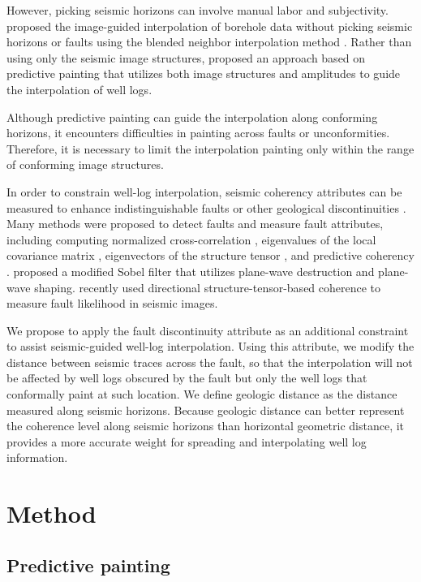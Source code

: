 However, picking seismic horizons can involve manual labor and subjectivity.
\cite{hale2010} proposed the image-guided interpolation of borehole data without picking seismic horizons or faults using the blended neighbor interpolation method \cite[]{hale2009}.
Rather than using only the seismic image structures, \cite{karimi} proposed an approach based on predictive painting \cite[]{pred} that utilizes both image structures and amplitudes to guide the interpolation of well logs.

Although predictive painting can guide the interpolation along conforming horizons, it encounters difficulties in painting across faults or unconformities.
Therefore, it is necessary to limit the interpolation painting only within the range of conforming image structures.

In order to constrain well-log interpolation, seismic coherency attributes can be measured to enhance indistinguishable faults or other geological discontinuities \cite[]{chopra}.
Many methods were proposed to detect faults and measure fault attributes, including computing normalized cross-correlation \cite[]{bahorich}, eigenvalues of the local covariance matrix \cite[]{gersztenkorn}, eigenvectors of the structure tensor \cite[]{randen,structure}, and predictive coherency \cite[]{predcoh}.
\cite{sobel} proposed a modified Sobel filter that utilizes plane-wave destruction and plane-wave shaping.
\cite{faultlike} recently used directional structure-tensor-based coherence to measure fault likelihood in seismic images.

We propose to apply the fault discontinuity attribute as an additional constraint to assist seismic-guided well-log interpolation.
Using this attribute, we modify the distance between seismic traces across the fault, so that the interpolation will not be affected by well logs obscured by the fault but only the well logs that conformally paint at such location.
We define geologic distance as the distance measured along seismic horizons.
Because geologic distance can better represent the coherence level along seismic horizons than horizontal geometric distance, it provides a more accurate weight for spreading and interpolating well log information.

\section{Method}
\subsection{Predictive painting}

